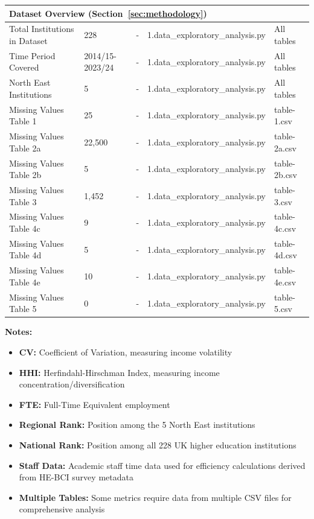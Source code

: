 \documentclass[journal,onecolumn, 10pt,draftclsnofoot]{IEEEtran}
\begin{document}
\begin{table}[h]
{\begin{tabular}{|l|l|l|l|l|}
\hline \multicolumn{5}{|l|}{\textbf{Dataset Overview (Section~\ref{sec:methodology})}} \\
\hline Total Institutions in Dataset & 228 & - & 1.data\_exploratory\_analysis.py & All tables \\
\hline Time Period Covered & 2014/15-2023/24 & - & 1.data\_exploratory\_analysis.py & All tables \\
\hline North East Institutions & 5 & - & 1.data\_exploratory\_analysis.py & All tables \\
\hline Missing Values Table 1 & 25 & - & 1.data\_exploratory\_analysis.py & table-1.csv \\
\hline Missing Values Table 2a & 22,500 & - & 1.data\_exploratory\_analysis.py & table-2a.csv \\
\hline Missing Values Table 2b & 5 & - & 1.data\_exploratory\_analysis.py & table-2b.csv \\
\hline Missing Values Table 3 & 1,452 & - & 1.data\_exploratory\_analysis.py & table-3.csv \\
\hline Missing Values Table 4c & 9 & - & 1.data\_exploratory\_analysis.py & table-4c.csv \\
\hline Missing Values Table 4d & 5 & - & 1.data\_exploratory\_analysis.py & table-4d.csv \\
\hline Missing Values Table 4e & 10 & - & 1.data\_exploratory\_analysis.py & table-4e.csv \\
\hline Missing Values Table 5 & 0 & - & 1.data\_exploratory\_analysis.py & table-5.csv \\
\hline
\end{tabular}
}
\label{tab:data-sources-complete}
\end{table}

\vspace{0.3cm}
\textbf{Notes:}
\begin{itemize}
    \item \textbf{CV:} Coefficient of Variation, measuring income volatility
    \item \textbf{HHI:} Herfindahl-Hirschman Index, measuring income concentration/diversification
    \item \textbf{FTE:} Full-Time Equivalent employment
    \item \textbf{Regional Rank:} Position among the 5 North East institutions
    \item \textbf{National Rank:} Position among all 228 UK higher education institutions
    \item \textbf{Staff Data:} Academic staff time data used for efficiency calculations derived from HE-BCI survey metadata
    \item \textbf{Multiple Tables:} Some metrics require data from multiple CSV files for comprehensive analysis
\end{itemize}
\end{document}

